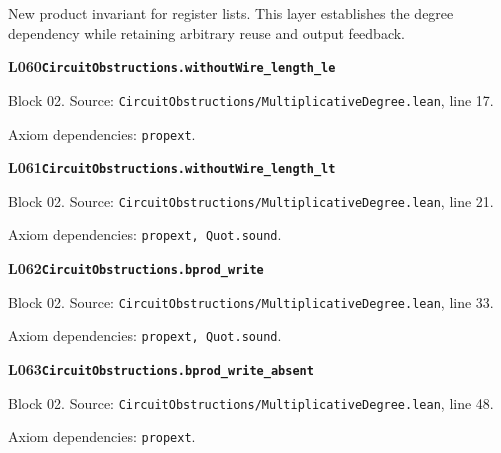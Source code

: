New product invariant for register lists. This layer establishes the degree dependency while retaining arbitrary reuse and output feedback.
\par\medskip
\begin{minipage}{\linewidth}
\hypertarget{L060}{}
{\small\sffamily\bfseries\color{ink}L060\quad\nolinkurl{CircuitObstructions.withoutWire_length_le}}\par
{\scriptsize\sffamily\color{muted}Block 02. Source: \nolinkurl{CircuitObstructions/MultiplicativeDegree.lean}, line 17.}\par
{}
{\scriptsize\sffamily\color{muted}Axiom dependencies: \nolinkurl{propext}.}
\end{minipage}\par\medskip
\begin{minipage}{\linewidth}
\hypertarget{L061}{}
{\small\sffamily\bfseries\color{ink}L061\quad\nolinkurl{CircuitObstructions.withoutWire_length_lt}}\par
{\scriptsize\sffamily\color{muted}Block 02. Source: \nolinkurl{CircuitObstructions/MultiplicativeDegree.lean}, line 21.}\par
{}
{\scriptsize\sffamily\color{muted}Axiom dependencies: \nolinkurl{propext, Quot.sound}.}
\end{minipage}\par\medskip
\begin{minipage}{\linewidth}
\hypertarget{L062}{}
{\small\sffamily\bfseries\color{ink}L062\quad\nolinkurl{CircuitObstructions.bprod_write}}\par
{\scriptsize\sffamily\color{muted}Block 02. Source: \nolinkurl{CircuitObstructions/MultiplicativeDegree.lean}, line 33.}\par
{}
{\scriptsize\sffamily\color{muted}Axiom dependencies: \nolinkurl{propext, Quot.sound}.}
\end{minipage}\par\medskip
\begin{minipage}{\linewidth}
\hypertarget{L063}{}
{\small\sffamily\bfseries\color{ink}L063\quad\nolinkurl{CircuitObstructions.bprod_write_absent}}\par
{\scriptsize\sffamily\color{muted}Block 02. Source: \nolinkurl{CircuitObstructions/MultiplicativeDegree.lean}, line 48.}\par
{}
{\scriptsize\sffamily\color{muted}Axiom dependencies: \nolinkurl{propext}.}
\end{minipage}\par\medskip
